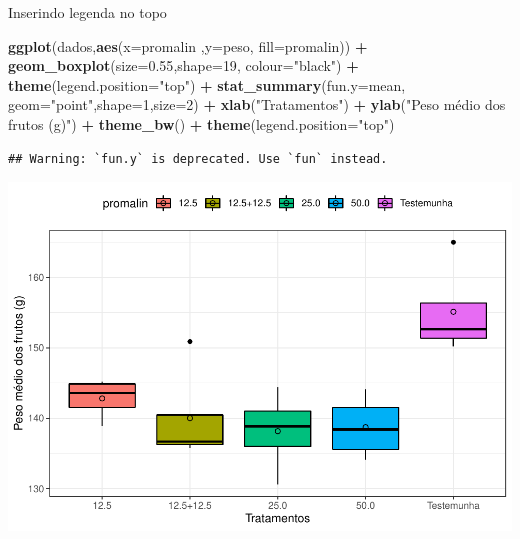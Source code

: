 \documentclass[
]{book}
\newenvironment{Shaded}{\begin{snugshade}}{\end{snugshade}}
\newcommand{\DataTypeTok}[1]{\textcolor[rgb]{0.13,0.29,0.53}{#1}}
\newcommand{\DecValTok}[1]{\textcolor[rgb]{0.00,0.00,0.81}{#1}}
\newcommand{\FloatTok}[1]{\textcolor[rgb]{0.00,0.00,0.81}{#1}}
\newcommand{\KeywordTok}[1]{\textcolor[rgb]{0.13,0.29,0.53}{\textbf{#1}}}
\newcommand{\NormalTok}[1]{#1}
\newcommand{\OperatorTok}[1]{\textcolor[rgb]{0.81,0.36,0.00}{\textbf{#1}}}
\newcommand{\StringTok}[1]{\textcolor[rgb]{0.31,0.60,0.02}{#1}}
\begin{document}
Inserindo legenda no topo

\begin{Shaded}
\begin{Highlighting}[]
\KeywordTok{ggplot}\NormalTok{(dados,}\KeywordTok{aes}\NormalTok{(}\DataTypeTok{x=}\NormalTok{promalin ,}\DataTypeTok{y=}\NormalTok{peso, }\DataTypeTok{fill=}\NormalTok{promalin)) }\OperatorTok{+}\StringTok{ }
\StringTok{      }\KeywordTok{geom_boxplot}\NormalTok{(}\DataTypeTok{size=}\FloatTok{0.55}\NormalTok{,}\DataTypeTok{shape=}\DecValTok{19}\NormalTok{, }\DataTypeTok{colour=}\StringTok{"black"}\NormalTok{) }\OperatorTok{+}\StringTok{ }
\StringTok{      }\KeywordTok{theme}\NormalTok{(}\DataTypeTok{legend.position=}\StringTok{"top"}\NormalTok{) }\OperatorTok{+}\StringTok{ }
\StringTok{      }\KeywordTok{stat_summary}\NormalTok{(}\DataTypeTok{fun.y=}\NormalTok{mean, }\DataTypeTok{geom=}\StringTok{"point"}\NormalTok{,}\DataTypeTok{shape=}\DecValTok{1}\NormalTok{,}\DataTypeTok{size=}\DecValTok{2}\NormalTok{) }\OperatorTok{+}\StringTok{ }
\StringTok{      }\KeywordTok{xlab}\NormalTok{(}\StringTok{"Tratamentos"}\NormalTok{) }\OperatorTok{+}\StringTok{  }
\StringTok{      }\KeywordTok{ylab}\NormalTok{(}\StringTok{"Peso médio dos frutos (g)"}\NormalTok{)  }\OperatorTok{+}
\StringTok{      }\KeywordTok{theme_bw}\NormalTok{() }\OperatorTok{+}
\StringTok{      }\KeywordTok{theme}\NormalTok{(}\DataTypeTok{legend.position=}\StringTok{"top"}\NormalTok{) }
\end{Highlighting}
\end{Shaded}

\begin{verbatim}
## Warning: `fun.y` is deprecated. Use `fun` instead.
\end{verbatim}

\includegraphics{TudodoR_files/figure-latex/unnamed-chunk-238-1.pdf}
\end{document}

